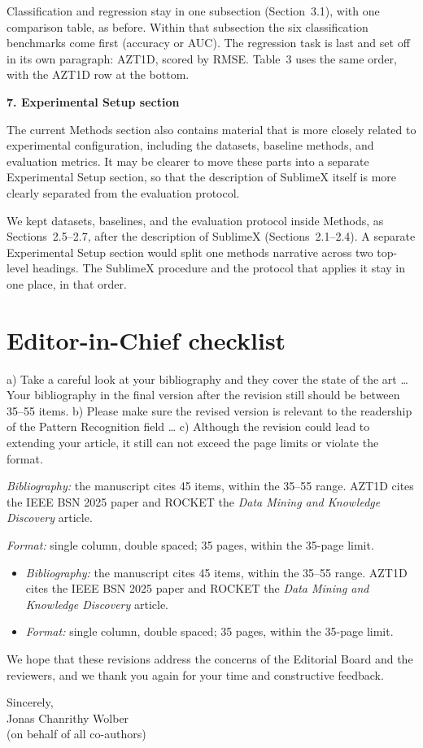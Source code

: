 \documentclass[11pt]{article}
\makeatletter
\newcommand{\rsp}{\par\vspace{0.9em}}
\newcommand{\rc}[1]{\begin{reviewerbox}#1\end{reviewerbox}}
\newcommand{\rcitem}[2]{\begin{reviewerbox}\textbf{#1}\par\smallskip#2\end{reviewerbox}}
\newcommand{\response}[2]{%
  \begin{responsebox}#1%
  \def\@responseitems{#2}%
  \ifx\@responseitems\empty\else\begin{itemize}[nosep,leftmargin=1.2em]#2\end{itemize}\fi
  \end{responsebox}\rsp}
\makeatother
\begin{document}
\response{Classification and regression stay in one subsection (Section~3.1), with one comparison
table, as before. Within that subsection the six classification benchmarks come first (accuracy or
AUC). The regression task is last and set off in its own paragraph: AZT1D, scored by RMSE.
Table~3 uses the same order, with the AZT1D row at the bottom.}{}

\rcitem{7. Experimental Setup section}{The current Methods section also contains material that is more
closely related to experimental configuration, including the datasets, baseline methods, and
evaluation metrics. It may be clearer to move these parts into a separate Experimental Setup section,
so that the description of SublimeX itself is more clearly separated from the evaluation protocol.}

\response{We kept datasets, baselines, and the evaluation protocol inside Methods, as
Sections~2.5--2.7, after the description of SublimeX (Sections~2.1--2.4). A separate Experimental
Setup section would split one methods narrative across two top-level headings. The SublimeX
procedure and the protocol that applies it stay in one place, in that order.}{}

\section*{Editor-in-Chief checklist}

\rc{a) Take a careful look at your bibliography and they cover the state of the art \ldots{} Your
bibliography in the final version after the revision still should be between 35--55 items.
b) Please make sure the revised version is relevant to the readership of the Pattern Recognition
field \ldots{} c) Although the revision could lead to extending your article, it still can not exceed
the page limits or violate the format.}

\response{}{
  \item \emph{Bibliography:} the manuscript cites 45 items, within the 35--55 range. AZT1D cites the
    IEEE BSN 2025 paper and ROCKET the \emph{Data Mining and Knowledge Discovery} article.
  \item \emph{Format:} single column, double spaced; 35 pages, within the 35-page limit.
}

\noindent We hope that these revisions address the concerns of the Editorial Board and the reviewers,
and we thank you again for your time and constructive feedback.

\bigskip
\noindent Sincerely,\\
Jonas Chanrithy Wolber\\
(on behalf of all co-authors)
\end{document}
